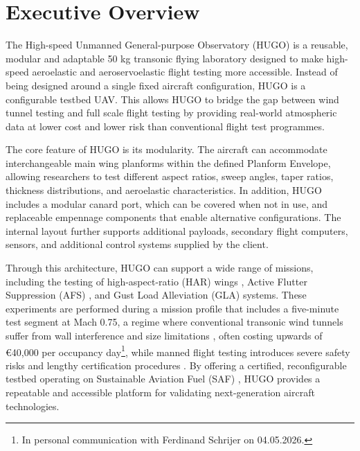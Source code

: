 \chapter{Executive Overview}
\label{ch:executive_overview}

The High-speed Unmanned General-purpose Observatory (HUGO) is a reusable, modular and adaptable 50 kg transonic flying laboratory designed to make high-speed aeroelastic and aeroservoelastic flight testing more accessible. Instead of being designed around a single fixed aircraft configuration, HUGO is a configurable testbed UAV. This allows HUGO to bridge the gap between wind tunnel testing and full scale flight testing by providing real-world atmospheric data at lower cost and lower risk than conventional flight test programmes.

The core feature of HUGO is its modularity. The aircraft can accommodate interchangeable main wing planforms within the defined Planform Envelope, allowing researchers to test different aspect ratios, sweep angles, taper ratios, thickness distributions, and aeroelastic characteristics. In addition, HUGO includes a modular canard port, which can be covered when not in use, and replaceable empennage components that enable alternative configurations. The internal layout further supports additional payloads, secondary flight computers, sensors, and additional control systems supplied by the client.

Through this architecture, HUGO can support a wide range of missions, including the testing of high-aspect-ratio (HAR) wings \cite{AFONSO201740, MA2024100983}, Active Flutter Suppression (AFS) \cite{Gilyard1983, Takarics2019}, and Gust Load Alleviation (GLA) systems. \cite{Sanghi2022} These experiments are performed during a mission profile that includes a five-minute test segment at Mach 0.75, a regime where conventional transonic wind tunnels suffer from wall interference and size limitations \cite{Stenfelt2015}, often costing upwards of €40,000 per occupancy day\footnote{\label{foot:schrijer-exec}In personal communication with Ferdinand Schrijer on 04.05.2026.}, while manned flight testing introduces severe safety risks and lengthy certification procedures \cite{Spitz2001}. By offering a certified, reconfigurable testbed operating on Sustainable Aviation Fuel (SAF) \cite{Gaillot2023}, HUGO provides a repeatable and accessible platform for validating next-generation aircraft technologies.



